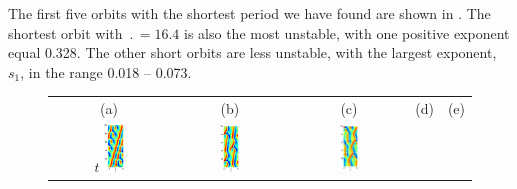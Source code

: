 The first five orbits with the shortest period we have found are
shown in .  The shortest orbit with
$\period{} = 16.4$ is also the most unstable, with one positive
 exponent equal 0.328.  The other short orbits are less
unstable, with the largest  exponent, $s_1$, in the range
0.018 -- 0.073.


\begin{figure}[t]
\begin{center}
\begin{tabular}{ccccc} (a) & (b) & (c) & (d) & (e)\\
$t$
\includegraphics[width=0.18\textwidth]{figs/ks22rpo016.3-02.86.eps}\hspace{-3ex} &
\includegraphics[width=0.18\textwidth]{figs/ks22rpo032.8-10.96.eps}\hspace{-3ex} &
\includegraphics[width=0.18\textwidth]{figs/ks22rpo033.5-04.04.eps}\hspace{-3ex} &

\end{tabular}
\end{center}
\end{figure}
